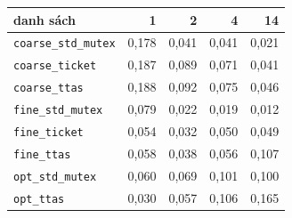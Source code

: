 \begin{tabular}{lrrrr}
\toprule
danh sách & 1 & 2 & 4 & 14 \\
\midrule
\texttt{coarse\_std\_mutex} & 0,178 & 0,041 & 0,041 & 0,021 \\
\texttt{coarse\_ticket} & 0,187 & 0,089 & 0,071 & 0,041 \\
\texttt{coarse\_ttas} & 0,188 & 0,092 & 0,075 & 0,046 \\
\texttt{fine\_std\_mutex} & 0,079 & 0,022 & 0,019 & 0,012 \\
\texttt{fine\_ticket} & 0,054 & 0,032 & 0,050 & 0,049 \\
\texttt{fine\_ttas} & 0,058 & 0,038 & 0,056 & 0,107 \\
\texttt{opt\_std\_mutex} & 0,060 & 0,069 & 0,101 & 0,100 \\
\texttt{opt\_ttas} & 0,030 & 0,057 & 0,106 & 0,165 \\
\bottomrule
\end{tabular}
